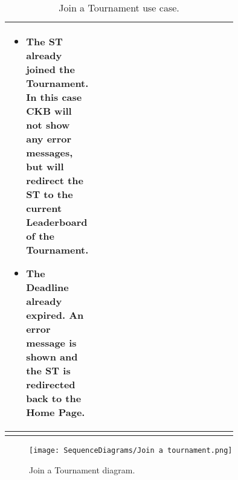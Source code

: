 \begin{center}
\begin{longtable}{|l|p{0.75\linewidth}|}
\begin{itemize}
            \item The ST already joined the Tournament. In this case CKB will not show any error messages, but will redirect the ST to the current Leaderboard of the Tournament.
            \item The Deadline already expired. An error message is shown and the ST is redirected back to the Home Page.
        \end{itemize}    \\
        \hline
        \caption{Join a Tournament use case.}
        \label{tab: join_a_Tournament_use_case}
    \end{longtable}
\end{center}

\begin{figure}[H]
    \begin{center}
        \texttt{[image: SequenceDiagrams/Join a tournament.png]}
        \caption{Join a Tournament diagram.}
        \label{fig:join_a_Tournament_seqd}%
    \end{center}
\end{figure}

